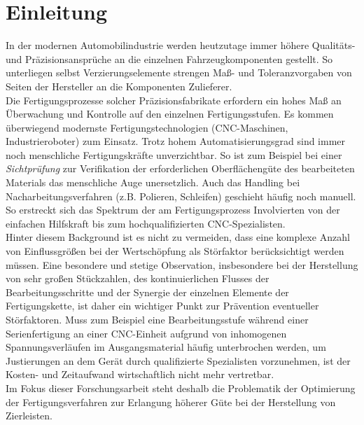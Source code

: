 \documentclass[12pt,a4paper,parskip,twoside,BCOR5mm,headsepline]{scrartcl}
\begin{document}
\section{Einleitung}
In der modernen Automobilindustrie werden heutzutage immer höhere Qualitäts- und Präzisionsansprüche an die einzelnen Fahrzeugkomponenten  gestellt. So unterliegen selbst Verzierungselemente strengen Maß- und Toleranzvorgaben von Seiten der Hersteller an die Komponenten Zulieferer.\\
 Die Fertigungsprozesse solcher Präzisionsfabrikate erfordern ein hohes Maß an Überwachung und Kontrolle auf den einzelnen Fertigungsstufen. Es kommen überwiegend modernste Fertigungstechnologien (CNC-Maschinen, Industrieroboter) zum Einsatz. Trotz hohem Automatisierungsgrad sind immer noch menschliche Fertigungskräfte unverzichtbar. So ist zum Beispiel bei einer \emph{Sichtprüfung} zur Verifikation der erforderlichen Oberflächengüte des bearbeiteten Materials  das menschliche Auge unersetzlich. Auch das Handling bei Nacharbeitungsverfahren (z.B. Polieren, Schleifen) geschieht häufig noch manuell. So  erstreckt sich das Spektrum der am Fertigungsprozess Involvierten von der einfachen Hilfskraft bis zum hochqualifizierten CNC-Spezialisten.\\
  Hinter diesem Background ist es nicht zu vermeiden, dass eine komplexe Anzahl von Einflussgrößen bei der Wertschöpfung als Störfaktor berücksichtigt werden müssen. Eine besondere und stetige Observation, insbesondere bei der Herstellung von sehr großen Stückzahlen,  des kontinuierlichen Flusses der Bearbeitungsschritte und der Synergie der einzelnen Elemente  der Fertigungskette, ist daher ein wichtiger Punkt zur Prävention eventueller  Störfaktoren. Muss zum Beispiel eine Bearbeitungsstufe während einer Serienfertigung an einer CNC-Einheit  aufgrund von inhomogenen Spannungsverläufen im Ausgangsmaterial häufig unterbrochen werden, um Justierungen an dem Gerät durch   qualifizierte Spezialisten vorzunehmen,  ist der Kosten- und Zeitaufwand wirtschaftlich nicht mehr vertretbar.\\
     Im Fokus dieser Forschungsarbeit steht deshalb die Problematik der Optimierung der Fertigungsverfahren zur Erlangung höherer Güte bei der Herstellung von Zierleisten.
 
\end{document}
